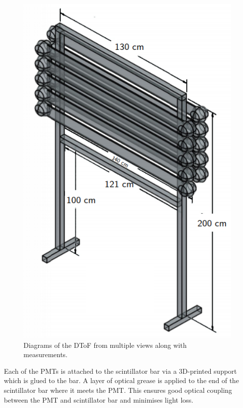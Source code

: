 \begin{figure}[h]
\begin{minipage}[t]{.4\linewidth}
    \includegraphics[width=\linewidth]{files/figures/hptpc_dtof_characterisation/dstofDiag}
  \end{minipage}
  \caption[Diagrams of the HPTPC DToF.]{Diagrams of the DToF from multiple views along with measurements.}
  \label{fig:dtofDiag}
\end{figure}

Each of the PMTs is attached to the scintillator bar via a 3D-printed support which is glued to the bar.
A layer of optical grease is applied to the end of the scintillator bar where it meets the PMT.
This ensures good optical coupling between the PMT and scintillator bar and minimises light loss.

